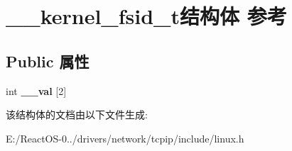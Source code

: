 \hypertarget{struct____kernel__fsid__t}{}\section{\+\_\+\+\_\+kernel\+\_\+fsid\+\_\+t结构体 参考}
\label{struct____kernel__fsid__t}
\subsection*{Public 属性}
\begin{DoxyCompactItemize}
\item 
\mbox{\label{struct____kernel__fsid__t_a17f1ab45bb070547764d9ed015e36ce3}} 
int {\bfseries \+\_\+\+\_\+val} \mbox{[}2\mbox{]}
\end{DoxyCompactItemize}


该结构体的文档由以下文件生成\+:\begin{DoxyCompactItemize}
\item 
E\+:/\+React\+O\+S-\/0../drivers/network/tcpip/include/linux.\+h\end{DoxyCompactItemize}
